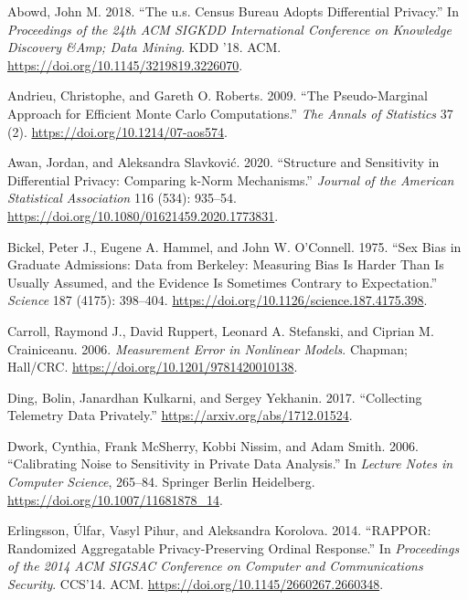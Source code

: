 \hypertarget{refs}{}
\begin{CSLReferences}{1}{0}
\leavevmode{}%
Abowd, John M. 2018. {``The u.s. Census Bureau Adopts Differential Privacy.''} In \emph{Proceedings of the 24th ACM SIGKDD International Conference on Knowledge Discovery \&Amp; Data Mining}. KDD '18. ACM. \url{https://doi.org/10.1145/3219819.3226070}.

\leavevmode{}%
Andrieu, Christophe, and Gareth O. Roberts. 2009. {``The Pseudo-Marginal Approach for Efficient Monte Carlo Computations.''} \emph{The Annals of Statistics} 37 (2). \url{https://doi.org/10.1214/07-aos574}.

\leavevmode{}%
Awan, Jordan, and Aleksandra Slavković. 2020. {``Structure and Sensitivity in Differential Privacy: Comparing k-Norm Mechanisms.''} \emph{Journal of the American Statistical Association} 116 (534): 935--54. \url{https://doi.org/10.1080/01621459.2020.1773831}.

\leavevmode{}%
Bickel, Peter J., Eugene A. Hammel, and John W. O'Connell. 1975. {``Sex Bias in Graduate Admissions: Data from Berkeley: Measuring Bias Is Harder Than Is Usually Assumed, and the Evidence Is Sometimes Contrary to Expectation.''} \emph{Science} 187 (4175): 398--404. \url{https://doi.org/10.1126/science.187.4175.398}.

\leavevmode{}%
Carroll, Raymond J., David Ruppert, Leonard A. Stefanski, and Ciprian M. Crainiceanu. 2006. \emph{Measurement Error in Nonlinear Models}. Chapman; Hall/CRC. \url{https://doi.org/10.1201/9781420010138}.

\leavevmode{}%
Ding, Bolin, Janardhan Kulkarni, and Sergey Yekhanin. 2017. {``Collecting Telemetry Data Privately.''} \url{https://arxiv.org/abs/1712.01524}.

\leavevmode{}%
Dwork, Cynthia, Frank McSherry, Kobbi Nissim, and Adam Smith. 2006. {``Calibrating Noise to Sensitivity in Private Data Analysis.''} In \emph{Lecture Notes in Computer Science}, 265--84. Springer Berlin Heidelberg. \url{https://doi.org/10.1007/11681878_14}.

\leavevmode{}%
Erlingsson, Úlfar, Vasyl Pihur, and Aleksandra Korolova. 2014. {``RAPPOR: Randomized Aggregatable Privacy-Preserving Ordinal Response.''} In \emph{Proceedings of the 2014 ACM SIGSAC Conference on Computer and Communications Security}. CCS'14. ACM. \url{https://doi.org/10.1145/2660267.2660348}.


\end{CSLReferences}
